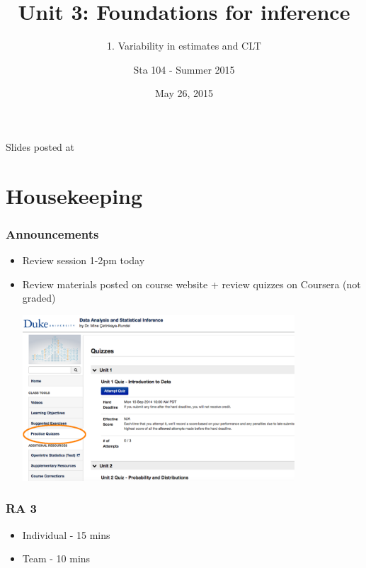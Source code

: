 \documentclass[slidestop,compress,mathserif,12pt,t,professionalfonts,xcolor=table]{beamer}
\title{Unit 3: Foundations for inference}
\subtitle{1. Variability in estimates and CLT}
\author{Sta 104 - Summer 2015}
\date{May 26, 2015}
\institute{Duke University, Department of Statistical Science}
\begin{document}



\begin{frame}[plain]

\titlepage
\vfill
{\scriptsize {} \hfill Slides posted at  \webLink{\CourseSite}{\CourseSite}}
\addtocounter{framenumber}{-1} 

\end{frame}


\section{Housekeeping}


\begin{frame}
\frametitle{Announcements}

\begin{itemize}

\item Review session 1-2pm today

\item Review materials posted on course website + review quizzes on Coursera (not graded)
\begin{center}
\includegraphics[width=0.8\textwidth]{figures/coursera_quiz}
\end{center}

\end{itemize}

\end{frame}


\begin{frame}
\frametitle{RA 3}

\begin{itemize}

\item Individual - 15 mins

\item Team - 10 mins

\end{itemize}

\end{frame}
\end{document}
